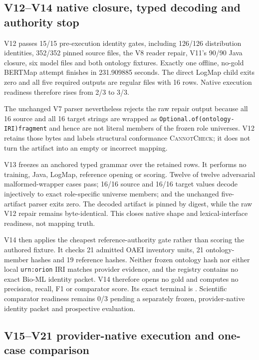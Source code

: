 \subsection{V12--V14 native closure, typed decoding and authority stop}

V12 passes 15/15 pre-execution identity gates, including 126/126 distribution
identities, 352/352 pinned source files, the V8 reader repair, V11's 90/90 Java
closure, six model files and both ontology fixtures. Exactly one offline,
no-gold BERTMap attempt finishes in 231.909885 seconds. The direct LogMap child
exits zero and all five required outputs are regular files with 16 rows. Native
execution readiness therefore rises from 2/3 to 3/3.

The unchanged V7 parser nevertheless rejects the raw repair output because all
16 source and all 16 target strings are wrapped as
\texttt{Optional.of(ontology-IRI)fragment} and hence are not literal members of
the frozen role universes. V12 retains those bytes and labels structural
conformance \textsc{CannotCheck}; it does not turn the artifact into an empty
or incorrect mapping.

V13 freezes an anchored typed grammar over the retained rows. It performs no
training, Java, LogMap, reference opening or scoring. Twelve of twelve
adversarial malformed-wrapper cases pass; 16/16 source and 16/16 target values
decode injectively to exact role-specific universe members; and the unchanged
five-artifact parser exits zero. The decoded artifact is pinned by digest,
while the raw V12 repair remains byte-identical. This closes native shape and
lexical-interface readiness, not mapping truth.

V14 then applies the cheapest reference-authority gate rather than scoring the
authored fixture. It checks 21 admitted OAEI inventory units, 21 ontology-member
hashes and 19 reference hashes. Neither frozen ontology hash nor either local
\texttt{urn:orion} IRI matches provider evidence, and the registry contains no
exact Bio-ML identity packet. V14 therefore opens no gold and computes no
precision, recall, F1 or comparator score. Its exact terminal is
.
Scientific comparator readiness remains 0/3 pending a separately frozen,
provider-native identity packet and prospective evaluation.

\subsection{V15--V21 provider-native execution and one-case comparison}

